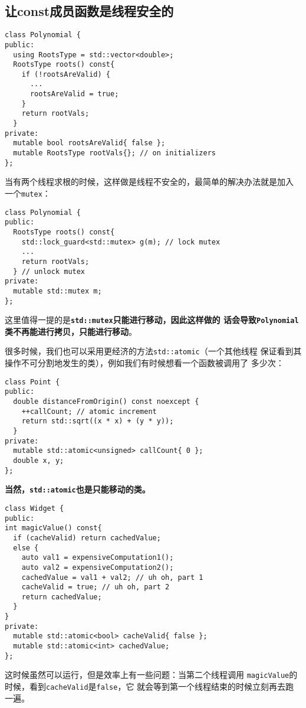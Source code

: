 \subsection{让const成员函数是线程安全的}
\label{sec:Item2-16}

\begin{verbatim}
class Polynomial {
public:
  using RootsType = std::vector<double>;
  RootsType roots() const{
    if (!rootsAreValid) { 
      ...  
      rootsAreValid = true;
    }
    return rootVals;
  }
private:
  mutable bool rootsAreValid{ false };
  mutable RootsType rootVals{}; // on initializers
};
\end{verbatim}

当有两个线程求根的时候，这样做是线程不安全的，最简单的解决办法就是加入
一个\texttt{mutex}：
\begin{verbatim}
class Polynomial {
public:
  RootsType roots() const{
    std::lock_guard<std::mutex> g(m); // lock mutex
    ...
    return rootVals;
  } // unlock mutex
private:
  mutable std::mutex m;
};
\end{verbatim}

这里值得一提的是\textbf{\texttt{std::mutex}只能进行移动，因此这样做的
  话会导致\texttt{Polynomial}类不再能进行拷贝，只能进行移动}。

很多时候，我们也可以采用更经济的方法\texttt{std::atomic}（一个其他线程
保证看到其操作不可分割地发生的类），例如我们有时候想看一个函数被调用了
多少次：
\begin{verbatim}
class Point {
public:
  double distanceFromOrigin() const noexcept {
    ++callCount; // atomic increment
    return std::sqrt((x * x) + (y * y));
  }
private:
  mutable std::atomic<unsigned> callCount{ 0 };
  double x, y;
};
\end{verbatim}
\textbf{当然，\texttt{std::atomic}也是只能移动的类。}

\begin{verbatim}
class Widget {
public:
int magicValue() const{
  if (cacheValid) return cachedValue;
  else {
    auto val1 = expensiveComputation1();
    auto val2 = expensiveComputation2();
    cachedValue = val1 + val2; // uh oh, part 1
    cacheValid = true; // uh oh, part 2
    return cachedValue;
  }
}
private:
  mutable std::atomic<bool> cacheValid{ false };
  mutable std::atomic<int> cachedValue;
};
\end{verbatim}

这时候虽然可以运行，但是效率上有一些问题：当第二个线程调用
\texttt{magicValue}的时候，看到\texttt{cacheValid}是\texttt{false}，它
就会等到第一个线程结束的时候立刻再去跑一遍。

